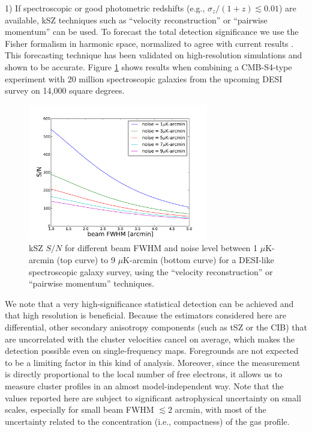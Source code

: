 1) If spectroscopic or good photometric redshifts (e.g., $\sigma_z / (1+z) \lesssim 0.01$) are available, kSZ techniques such as ``velocity reconstruction'' \cite{Ho:2009iw} or ``pairwise momentum'' \cite{Ferreira:1998id} can be used.  To forecast the total detection significance we use the Fisher formalism in harmonic space, normalized to agree with current results \cite{Ade:2015lza,Schaan:2015uaa}. This forecasting technique has been validated on high-resolution simulations and shown to be accurate.
Figure \ref{fig:S4_kSZ_forecast} shows results when combining a CMB-S4-type experiment with 20 million spectroscopic galaxies from the upcoming DESI survey \cite{Levi:2013gra} on 14,000 square degrees.  \begin{figure}[ht]
\centering
\includegraphics[width=0.7\textwidth]{DarkEnergy/S4_kSZ_forecast.pdf}
\caption{kSZ $S/N$ for different beam FWHM and noise level between 1 $\mu$K-arcmin (top curve) to 9 $\mu$K-arcmin (bottom curve) for a DESI-like spectroscopic galaxy survey, using the ``velocity reconstruction'' or ``pairwise momentum'' techniques.}
\label{fig:S4_kSZ_forecast}
\end{figure}
We note that a very high-significance statistical detection can be achieved and that high resolution is beneficial. Because the estimators considered here are differential, other secondary anisotropy components (such as tSZ or the CIB) that are uncorrelated with the cluster velocities cancel on average, which makes the detection possible even on single-frequency maps.  Foregrounds are not expected to be a limiting factor in this kind of analysis.  Moreover, since the measurement is directly proportional to the local number of free electrons, it allows us to measure cluster profiles in an almost model-independent way.
Note that the values reported here are subject to significant astrophysical uncertainty on small scales, especially for small beam FWHM $\lesssim 2$ arcmin, with most of the uncertainty related to the concentration (i.e., compactness) of the gas profile.



